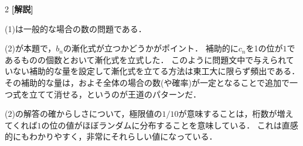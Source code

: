 \documentclass[../../main.tex]{subfiles}
\begin{document}
\begin{multicols}{2}
  {\bf[解説]}

  (1)は一般的な場合の数の問題である．

  (2)が本題で，$b_n$の漸化式が立つかどうかがポイント．
  補助的に$c_n$を1の位が$1$であるものの個数とおいて漸化式を立式した．
  このように問題文中で与えられていない補助的な量を設定して漸化式を立てる方法は東工大に限らず頻出である．
  その補助的な量は，およそ全体の場合の数(や確率)が一定となることで追加で一つ式を立てて消せる，というのが王道のパターンだ．

  (2)の解答の確からしさについて，極限値の$1/10$が意味することは，桁数が増えてくれば$1$の位の値がほぼランダムに分布することを意味している．
  これは直感的にもわかりやすく，非常にそれらしい値になっている．

  \newpage
\end{multicols}
\end{document}
